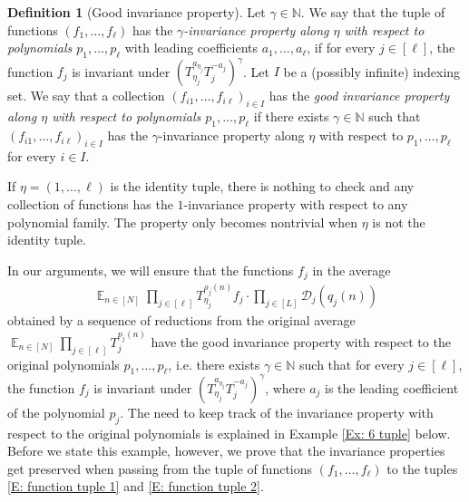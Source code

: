 \documentclass[11pt]{amsart}
\theoremstyle{definition}
\newtheorem*{definition}{Definition}
\newcommand{\N}{{\mathbb N}}
\newcommand{\CD}{{\mathcal D}}
\DeclareMathOperator*{\E}{\mathbb{E}}
\newcommand{\brac}[1]{\mathopen{}\left( #1 \mathclose{}\right)}
\begin{document}
\begin{definition}[Good invariance property]
    Let $\gamma\in\N$. We say that the tuple of functions $(f_1, \ldots, f_\ell)$ has  the \emph{$\gamma$-invariance property along $\eta$ with respect to  polynomials $p_1, \ldots, p_\ell$} with leading coefficients $a_1, \ldots, a_\ell$,  if for every $j\in[\ell]$, the function $f_j$ is invariant under $\brac{T_{\eta_j}^{a_{\eta_j}}T_j^{-a_j}}^{\gamma}$.  Let $I$ be a (possibly infinite) indexing set.
    We say that a collection $(f_{i1}, \ldots, f_{i\ell})_{i\in I}$ has the \emph{good invariance property along $\eta$ with respect to  polynomials $p_1, \ldots, p_\ell$} if there exists $\gamma\in\N$ such that $(f_{i1}, \ldots, f_{i\ell})_{i\in I}$ has the $\gamma$-invariance property along $\eta$ with respect to $p_1, \ldots, p_\ell$ for every $i\in I$.
\end{definition}


If $\eta=(1, \ldots, \ell)$ is the identity tuple, there is nothing to check and any collection of functions has the $1$-invariance property with respect to any polynomial family. The property only becomes nontrivial when $\eta$ is not the identity tuple.

In our arguments, we will ensure that the functions $f_j$ in the average
\begin{align*}
    \E_{n\in[N]}\prod_{j\in[\ell]}T_{\eta_{j}}^{\rho_j(n)} f_j\cdot\prod_{j\in[L]}\CD_{j}(q_j(n))
\end{align*}
 obtained by a sequence of reductions from the original average $\E_{n\in[N]}\prod_{j\in[\ell]}T_{j}^{p_j(n)}$ have the good invariance property with respect to the original polynomials $p_1, \ldots, p_\ell$, i.e. there exists $\gamma\in\N$ such that for every $j\in[\ell]$, the function $f_j$ is invariant under $\brac{T_{\eta_j}^{a_{\eta_{j}}}T_j^{-a_{j}}}^{\gamma}$,  where $a_j$ is the leading coefficient of the polynomial $p_j$. %
The need to keep track of the invariance property with respect to the original polynomials is explained in Example \ref{Ex: 6 tuple} below. Before we state this example, however, we prove that the invariance properties get preserved when passing from the tuple of functions $(f_1, \ldots, f_\ell)$ to the tuples \eqref{E: function tuple 1} and \eqref{E: function tuple 2}.

\end{document}
